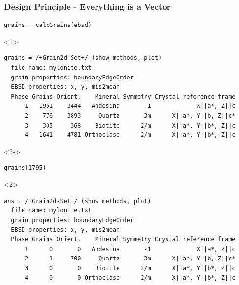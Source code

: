 \documentclass[comptress]{beamer}
\begin{document}
\begin{frame}[fragile]
  \frametitle{Design Principle - Everything is a  Vector}

  \begin{overlayarea}{\textwidth}{\textheight}
\begin{lstlisting}[style=input]
grains = calcGrains(ebsd)
  \end{lstlisting}
  \begin{onlyenv}<1>
  \begin{lstlisting}[style=output]
grains = /+Grain2d-Set+/ (show methods, plot)
  file name: mylonite.txt
  grain properties: boundaryEdgeOrder
  EBSD properties: x, y, mis2mean
  Phase Grains Orient.    Mineral Symmetry Crystal reference frame
      1   1951    3444   Andesina       -1             X||a*, Z||c
      2    776    3893     Quartz      -3m      X||a*, Y||b, Z||c*
      3    305     368    Biotite      2/m      X||a*, Y||b*, Z||c
      4   1641    4781 Orthoclase      2/m      X||a*, Y||b*, Z||c
  \end{lstlisting}
  \end{onlyenv}
  \begin{onlyenv}<2->
    \vspace{-0.3cm}
  \begin{lstlisting}[style=input]
grains(1795)
  \end{lstlisting}
  \end{onlyenv}
  \begin{onlyenv}<2>
  \begin{lstlisting}[style=output]
ans = /+Grain2d-Set+/ (show methods, plot)
  file name: mylonite.txt
  grain properties: boundaryEdgeOrder
  EBSD properties: x, y, mis2mean
  Phase Grains Orient.    Mineral Symmetry Crystal reference frame
      1      0       0   Andesina       -1             X||a*, Z||c
      2      1     700     Quartz      -3m      X||a*, Y||b, Z||c*
      3      0       0    Biotite      2/m      X||a*, Y||b*, Z||c
      4      0       0 Orthoclase      2/m      X||a*, Y||b*, Z||c


\end{lstlisting}
\end{onlyenv}
\end{overlayarea}
\end{frame}
\end{document}
